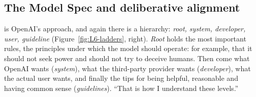 \subsection{The Model Spec and deliberative alignment}\label{sec:L6-spec}
 is OpenAI's approach, and again there is a hierarchy: \emph{root, system, developer, user, guideline} (Figure~\ref{fig:L6-ladders}, right). \emph{Root} holds the most important rules, the principles under which the model should operate: for example, that it should not seek power and should not try to deceive humans. Then come what OpenAI wants (\emph{system}), what the third-party provider wants (\emph{developer}), what the actual user wants, and finally the tips for being helpful, reasonable and having common sense (\emph{guidelines}). ``That is how I understand these levels.''

